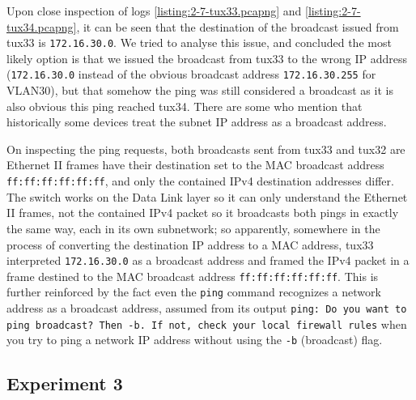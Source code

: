 \documentclass[a4paper, 11pt]{report}
\begin{document}
Upon close inspection of logs \ref{listing:2-7-tux33.pcapng} and \ref{listing:2-7-tux34.pcapng}, it can be seen that the destination of the broadcast issued from tux33 is \texttt{172.16.30.0}.
We tried to analyse this issue, and concluded the most likely option is that we issued the broadcast from tux33 to the wrong IP address (\texttt{172.16.30.0} instead of the obvious broadcast address \texttt{172.16.30.255} for VLAN30), but that somehow the ping was still considered a broadcast as it is also obvious this ping reached tux34.
There are some \cite{ping-subnet-address-1}\cite{ping-subnet-address-2} who mention that historically some devices treat the subnet IP address as a broadcast address.

On inspecting the ping requests, both broadcasts sent from tux33 and tux32 are Ethernet II frames have their destination set to the MAC broadcast address \texttt{ff:ff:ff:ff:ff:ff}, and only the contained IPv4 destination addresses differ.
The switch works on the Data Link layer so it can only understand the Ethernet II frames, not the contained IPv4 packet so it broadcasts both pings in exactly the same way, each in its own subnetwork; so apparently, somewhere in the process of converting the destination IP address to a MAC address, tux33 interpreted \texttt{172.16.30.0} as a broadcast address and framed the IPv4 packet in a frame destined to the MAC broadcast address \texttt{ff:ff:ff:ff:ff:ff}. This is further reinforced by the fact even the \texttt{ping} command recognizes a network address as a broadcast address, assumed from its output \texttt{ping: Do you want to ping broadcast? Then -b. If not, check your local firewall rules} when you try to ping a network IP address without using the \texttt{-b} (broadcast) flag. 

\subsection{Experiment 3} \label{sec:Exp3}
\end{document}
